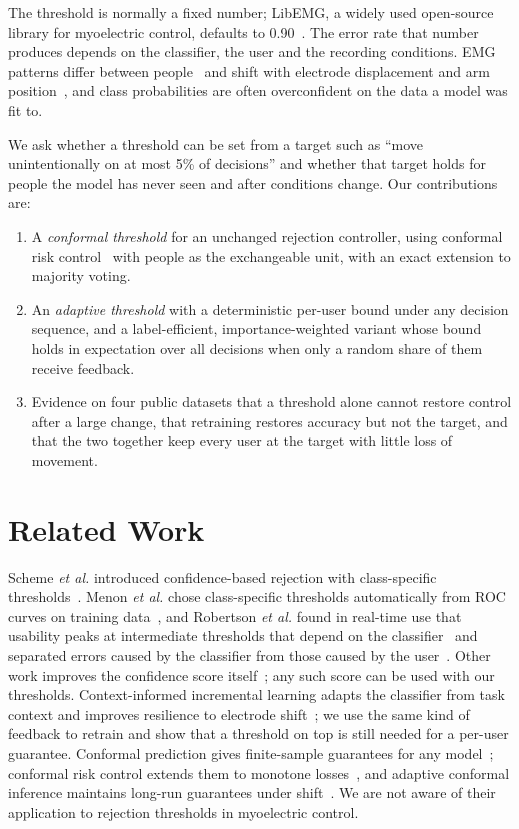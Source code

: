 \documentclass[conference]{IEEEtran}
\begin{document}
The threshold is normally a fixed number; LibEMG, a widely used open-source library for myoelectric control, defaults to 0.90~\cite{eddy2023}. The error rate that number produces depends on the classifier, the user and the recording conditions. EMG patterns differ between people~\cite{yang2024} and shift with electrode displacement and arm position~\cite{campbell2024,fougner2011}, and class probabilities are often overconfident on the data a model was fit to.

We ask whether a threshold can be set from a target such as ``move unintentionally on at most 5\% of decisions'' and whether that target holds for people the model has never seen and after conditions change. Our contributions are:
\begin{enumerate}
\item A \emph{conformal threshold} for an unchanged rejection controller, using conformal risk control~\cite{angelopoulos2024} with people as the exchangeable unit, with an exact extension to majority voting.
\item An \emph{adaptive threshold} with a deterministic per-user bound under any decision sequence, and a label-efficient, importance-weighted variant whose bound holds in expectation over all decisions when only a random share of them receive feedback.
\item Evidence on four public datasets that a threshold alone cannot restore control after a large change, that retraining restores accuracy but not the target, and that the two together keep every user at the target with little loss of movement.
\end{enumerate}

\section{Related Work}

Scheme \emph{et al.} introduced confidence-based rejection with class-specific thresholds~\cite{scheme2013}. Menon \emph{et al.} chose class-specific thresholds automatically from ROC curves on training data~\cite{menon2015}, and Robertson \emph{et al.} found in real-time use that usability peaks at intermediate thresholds that depend on the classifier~\cite{robertson2019} and separated errors caused by the classifier from those caused by the user~\cite{robertson2018}. Other work improves the confidence score itself~\cite{tam2024,aydogan2026}; any such score can be used with our thresholds. Context-informed incremental learning adapts the classifier from task context and improves resilience to electrode shift~\cite{campbell2024}; we use the same kind of feedback to retrain and show that a threshold on top is still needed for a per-user guarantee. Conformal prediction gives finite-sample guarantees for any model~\cite{vovk2005}; conformal risk control extends them to monotone losses~\cite{angelopoulos2024}, and adaptive conformal inference maintains long-run guarantees under shift~\cite{gibbs2021,angelopoulos2023pid}. We are not aware of their application to rejection thresholds in myoelectric control.
\end{document}
